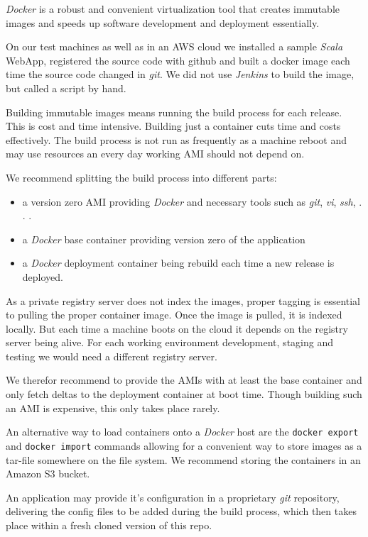 \documentclass[captions=tableheading]{article}
\begin{document}
\emph{Docker} is a robust and convenient virtualization tool that creates immutable images and speeds up software development and deployment essentially.  

On our test machines as well as in an AWS cloud we installed a sample \emph{Scala} WebApp, registered the source code with github and built a docker image each time the source code changed in \emph{git}. We did not use \emph{Jenkins} to build the image, but called a script by hand. 

Building immutable images means running the build process for each release. This is cost and time intensive. Building just a container cuts time and costs effectively. The build process is not run as frequently as a machine reboot and may use resources an every day working AMI should not depend on. 

We recommend splitting the build process into different parts:
\begin{itemize}
\item a version zero AMI providing \emph{Docker} and necessary tools such as \emph{git}, \emph{vi}, \emph{ssh}, . . .
\item a \emph{Docker} base container providing version zero of  the application
\item a \emph{Docker} deployment container being rebuild each time a new release is deployed.
\end{itemize}

As a private registry server does not index the images, proper tagging is essential to pulling the proper container image. Once the image is pulled, it is indexed locally. But each time a machine boots on the cloud it depends on the registry server being alive. For each working environment development, staging and testing we would need a different registry server. 

We therefor recommend to provide the AMIs with at least the base container and only fetch deltas to the deployment container at boot time. Though building such an AMI is expensive, this only takes place rarely.

An alternative way to load containers onto a \emph{Docker} host are the \texttt{docker export} and \texttt{docker import} commands allowing for a convenient way to store images as a tar-file somewhere on the file system. We recommend storing the containers in an Amazon S3 bucket.

An application may provide it's configuration in a proprietary \emph{git} repository, delivering the config files to be added during the build process, which then takes place within a fresh cloned version of this repo. 
\end{document}
